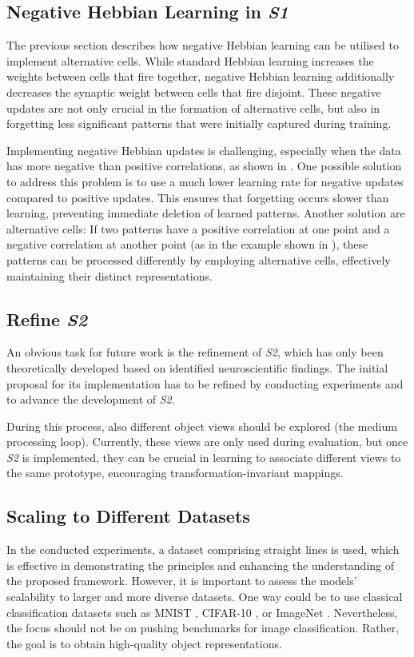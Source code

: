 \subsection{Negative Hebbian Learning in \emph{S1}}
The previous section describes how negative Hebbian learning can be utilised to implement alternative cells.
While standard Hebbian learning increases the weights between cells that fire together, negative Hebbian learning additionally decreases the synaptic weight between cells that fire disjoint.
These negative updates are not only crucial in the formation of alternative cells, but also in forgetting less significant patterns that were initially captured during training.

Implementing negative Hebbian updates is challenging, especially when the data has more negative than positive correlations, as shown in .
One possible solution to address this problem is to use a much lower learning rate for negative updates compared to positive updates. This ensures that forgetting occurs slower than learning, preventing immediate deletion of learned patterns.
Another solution are alternative cells: If two patterns have a positive correlation at one point and a negative correlation at another point (as in the example shown in ), these patterns can be processed differently by employing alternative cells, effectively maintaining their distinct representations.


\subsection{Refine \emph{S2}}
An obvious task for future work is the refinement of \emph{S2}, which has only been theoretically developed based on identified neuroscientific findings. The initial proposal for its implementation has to be refined by conducting experiments and to advance the development of \emph{S2}.

During this process, also different object views should be explored (the medium processing loop). Currently, these views are only used during evaluation, but once \emph{S2} is implemented, they can be crucial in learning to associate different views to the same prototype, encouraging transformation-invariant mappings.



\subsection{Scaling to Different Datasets}
In the conducted experiments, a dataset comprising straight lines is used, which is effective in demonstrating the principles and enhancing the understanding of the proposed framework.
However, it is important to assess the models' scalability to larger and more diverse datasets.
One way could be to use classical classification datasets such as MNIST , CIFAR-10 , or ImageNet .
Nevertheless, the focus should not be on pushing benchmarks for image classification.
Rather, the goal is to obtain high-quality object representations.

